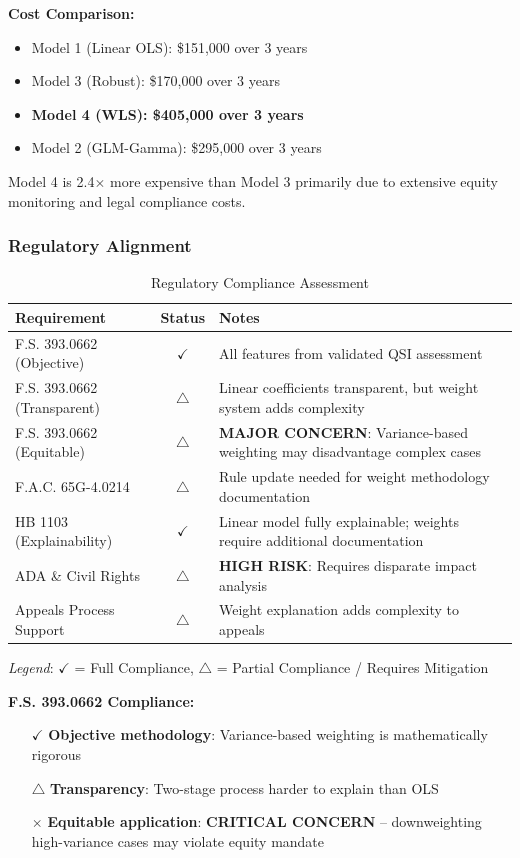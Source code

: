 \textbf{Cost Comparison:}
\begin{itemize}
    \item Model 1 (Linear OLS): \$151,000 over 3 years
    \item Model 3 (Robust): \$170,000 over 3 years  
    \item \textbf{Model 4 (WLS): \$405,000 over 3 years}
    \item Model 2 (GLM-Gamma): \$295,000 over 3 years
\end{itemize}

Model 4 is 2.4$\times$ more expensive than Model 3 primarily due to extensive equity monitoring and legal compliance costs.

\subsubsection{Regulatory Alignment}

\begin{table}[h]
\centering
\caption{Regulatory Compliance Assessment}
\begin{tabular}{p{4.5cm}cp{6cm}}
\toprule
\textbf{Requirement} & \textbf{Status} & \textbf{Notes} \\
\midrule
F.S. 393.0662 (Objective) & $\checkmark$ & All features from validated QSI assessment \\
F.S. 393.0662 (Transparent) & $\triangle$ & Linear coefficients transparent, but weight system adds complexity \\
F.S. 393.0662 (Equitable) & $\triangle$ & \textbf{MAJOR CONCERN}: Variance-based weighting may disadvantage complex cases \\
F.A.C. 65G-4.0214 & $\triangle$ & Rule update needed for weight methodology documentation \\
HB 1103 (Explainability) & $\checkmark$ & Linear model fully explainable; weights require additional documentation \\
ADA \& Civil Rights & $\triangle$ & \textbf{HIGH RISK}: Requires disparate impact analysis \\
Appeals Process Support & $\triangle$ & Weight explanation adds complexity to appeals \\
\bottomrule
\end{tabular}
\end{table}

\textit{Legend}: $\checkmark$ = Full Compliance, $\triangle$ = Partial Compliance / Requires Mitigation

\textbf{F.S. 393.0662 Compliance:}
\begin{itemize}
    \item[$\checkmark$] \textbf{Objective methodology}: Variance-based weighting is mathematically rigorous
    \item[$\triangle$] \textbf{Transparency}: Two-stage process harder to explain than OLS
    \item[$\times$] \textbf{Equitable application}: \textbf{CRITICAL CONCERN} -- downweighting high-variance cases may violate equity mandate
\end{itemize}

